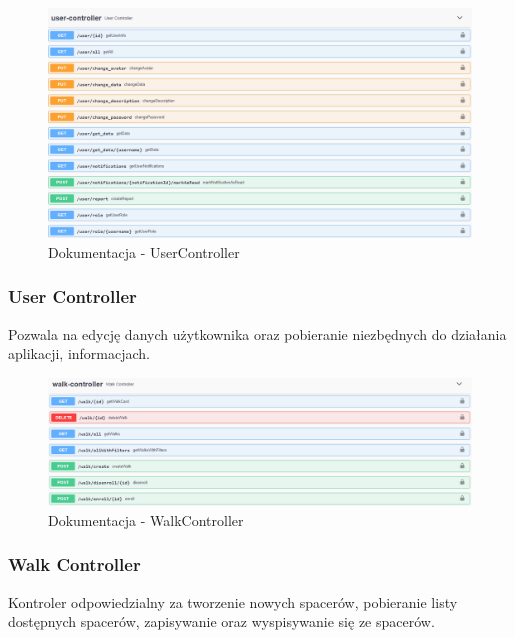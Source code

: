 \begin{figure}[H]
    \centering
    \includegraphics[width=1\linewidth]{rysunki/sw-5.PNG}
    \caption{Dokumentacja - UserController}
    \label{fig:swagger-5}
\end{figure}
\subsubsection{User Controller}
Pozwala na edycję danych użytkownika oraz pobieranie niezbędnych do działania aplikacji, informacjach. 

\begin{figure}[H]
    \centering
    \includegraphics[width=1\linewidth]{rysunki/sw-6.PNG}
    \caption{Dokumentacja - WalkController}
    \label{fig:swagger-6}
\end{figure}
\subsubsection{Walk Controller}
Kontroler odpowiedzialny za tworzenie nowych spacerów, pobieranie listy dostępnych spacerów, zapisywanie oraz wyspisywanie się ze spacerów.

